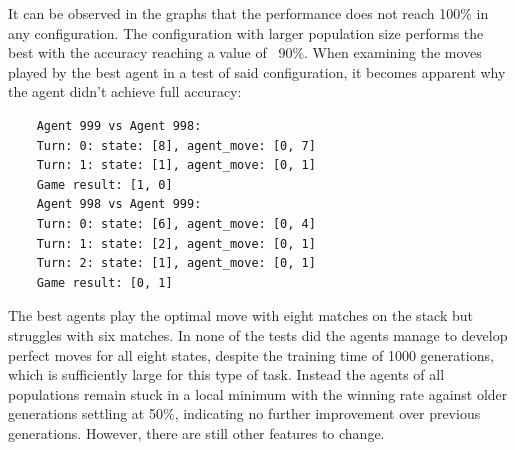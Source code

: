 \documentclass[11pt]{report}
\begin{document}
\begin{enumerate}
\begin{figure}[H]
\begin{adjustbox}{valign=c,margin=-5mm 0pt 0pt 0pt}
\begin{minipage}{1.1\textwidth}
\begin{subfigure}[b]{0.45\textwidth}
                    \begin{center}
                    \end{center}

                \end{subfigure}


            \end{minipage}
        \end{adjustbox}
        \label{fig:performances-2}
    \end{figure}
    It can be observed in the graphs that the performance does not reach 100\% in any configuration.
    The configuration with larger population size performs the best with the accuracy reaching a value of ~90\%.
    When examining the moves played by the best agent in a test of said configuration, it becomes apparent why the agent didn't achieve full accuracy:
    \begin{verbatim}
    Agent 999 vs Agent 998:
    Turn: 0: state: [8], agent_move: [0, 7]
    Turn: 1: state: [1], agent_move: [0, 1]
    Game result: [1, 0]
    Agent 998 vs Agent 999:
    Turn: 0: state: [6], agent_move: [0, 4]
    Turn: 1: state: [2], agent_move: [0, 1]
    Turn: 2: state: [1], agent_move: [0, 1]
    Game result: [0, 1]
    \end{verbatim}
    The best agents play the optimal move with eight matches on the stack but struggles with six matches.
    In none of the tests did the agents manage to develop perfect moves for all eight states, despite the training time of 1000 generations, which is sufficiently large for this type of task.
    Instead the agents of all populations remain stuck in a local minimum with the winning rate against older generations settling at 50\%, indicating no further improvement over previous generations.
    However, there are still other features to change.


\end{enumerate}
\end{document}
